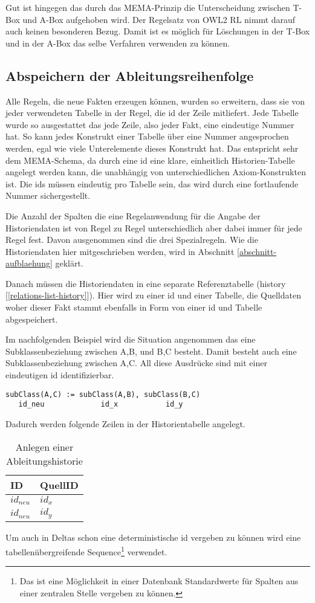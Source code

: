 Gut ist hingegen das durch das MEMA-Prinzip die Unterscheidung zwischen T-Box und A-Box aufgehoben wird. Der Regelsatz von OWL2 RL nimmt darauf auch keinen besonderen Bezug. Damit ist es möglich für Löschungen in der T-Box und in der A-Box das selbe Verfahren verwenden zu können.

\subsection{Abspeichern der Ableitungsreihenfolge}
Alle Regeln, die neue Fakten erzeugen können, wurden so erweitern, dass sie von jeder verwendeten Tabelle in der Regel, die id der Zeile mitliefert. Jede Tabelle wurde so ausgestattet das jede Zeile, also jeder Fakt, eine eindeutige Nummer hat. So kann jedes Konstrukt einer Tabelle über eine Nummer angesprochen werden, egal wie viele Unterelemente dieses Konstrukt hat. Das entspricht sehr dem MEMA-Schema, da durch eine id eine klare, einheitlich Historien-Tabelle angelegt werden kann, die unabhängig von unterschiedlichen Axiom-Konstrukten ist. Die ids müssen eindeutig pro Tabelle sein, das wird durch eine fortlaufende Nummer sichergestellt.

Die Anzahl der Spalten die eine Regelanwendung für die Angabe der Historiendaten ist von Regel zu Regel unterschiedlich aber dabei immer für jede Regel fest. Davon ausgenommen sind die drei Spezialregeln. Wie die Historiendaten hier mitgeschrieben werden, wird in Abschnitt \ref{abschnitt-aufblaehung} geklärt.

Danach müssen die Historiendaten in eine separate Referenztabelle (history [\ref{relations-list-history}]). Hier wird zu einer id und einer Tabelle, die Quelldaten woher dieser Fakt stammt ebenfalls in Form von einer id und Tabelle abgespeichert.

Im nachfolgenden Beispiel wird die Situation angenommen das eine Subklassenbeziehung zwischen A,B, und B,C besteht. Damit besteht auch eine Subklassenbeziehung zwischen A,C. All diese Ausdrücke sind mit einer eindeutigen id identifizierbar.
\begin{verbatim}
subClass(A,C) := subClass(A,B), subClass(B,C)
   id_neu             id_x           id_y
\end{verbatim}

Dadurch werden folgende Zeilen in der Historientabelle angelegt.

\begin{table}[htb]
\begin{center}
\begin{tabular}{l|l}
ID & QuellID \\ \hline
$id_{neu}$ & $id_x$ \\
$id_{neu}$ & $id_y$
\end{tabular}
\end{center}
\caption{Anlegen einer Ableitungshistorie}
\label{table-inference-history}
\end{table}
Um auch in Deltas schon eine deterministische id vergeben zu können wird eine tabellenübergreifende Sequence\footnote{Das ist eine Möglichkeit in einer Datenbank Standardwerte für Spalten aus einer zentralen Stelle vergeben zu können.} verwendet.

